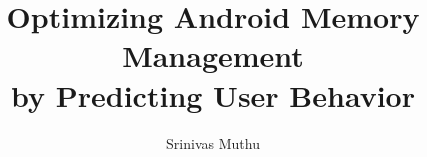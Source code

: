 \documentclass[12pt]{uthesis-v12}  %
\begin{document}


\title{Optimizing Android Memory Management
       \protect\\ by Predicting User Behavior}
       

\author{Srinivas Muthu}



\end{document}
